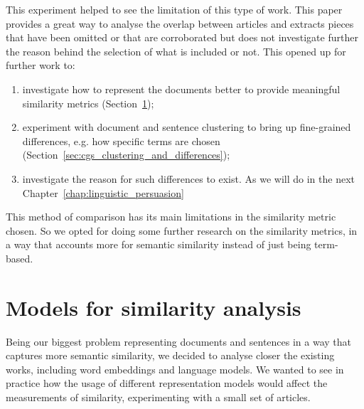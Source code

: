 This experiment helped to see the limitation of this type of work. %
This paper provides a great way to analyse the overlap between articles and extracts pieces that have been omitted or that are corroborated but does not investigate further the reason behind the selection of what is included or not.
This opened up for further work to:
\begin{enumerate}
    \item investigate how to represent the documents better to provide meaningful similarity metrics (Section~\ref{sec:cgs_similarity});
    \item experiment with document and sentence clustering to bring up fine-grained differences, e.g. how specific terms are chosen (Section~\ref{sec:cgs_clustering_and_differences});
    \item investigate the reason for such differences to exist. As we will do in the next Chapter~\ref{chap:linguistic_persuasion}
\end{enumerate}

This method of comparison has its main limitations in the similarity metric chosen. So we opted for doing some further research on the similarity metrics, in a way that accounts more for semantic similarity instead of just being term-based.


\section{\statusgreen Models for similarity analysis}
\label{sec:cgs_similarity}
Being our biggest problem representing documents and sentences in a way that captures more semantic similarity, we decided to analyse closer the existing works, including word embeddings and language models.
We wanted to see in practice how the usage of different representation models would affect the measurements of similarity, experimenting with a small set of articles. 

